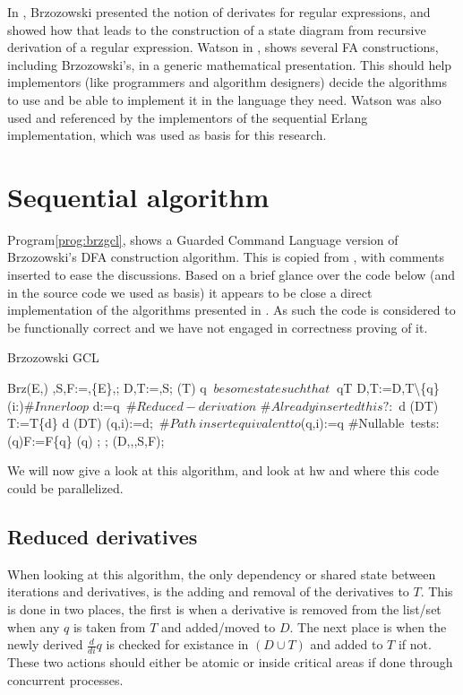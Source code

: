 \documentclass[a4paper,11pt]{report}
\begin{document}
In \cite{brzozowski1964derivatives}, Brzozowski presented the notion
of derivates for regular expressions, and showed how that leads to the
construction of a state diagram from recursive derivation of a regular
expression.  Watson in \cite{watson1995taxonomies}, shows several FA
constructions, including Brzozowski's, in a generic mathematical
presentation. This should help implementors (like programmers and
algorithm designers) decide the algorithms to use and be able to
implement it in the language they need. Watson was also used and
referenced by the implementors of the sequential Erlang
implementation, which was used as basis for this research.

\section{Sequential algorithm}
\label{sec:seq-algo}

Program\ref{prog:brzgcl}, shows a Guarded Command Language version of
Brzozowski's DFA construction algorithm. This is copied from
\cite{strauss2008concurrent}, with comments inserted to ease the
discussions. Based on a brief glance over the code below (and in the
source code we used as basis) it appears to be close a direct
implementation of the algorithms presented in
\cite{watson1995taxonomies}. As such the code is considered to be
functionally correct and we have not engaged in correctness proving
of it. \begin{Program}[thf]
\caption{Brzozowski GCL 
\cite{Struass}}\label{prog:brzgcl}
\begin{gcl}
\FUNC Brz(E,\Sigma)\ARROW
\delta,S,F:=\emptyset,\{E\},\emptyset;
D,T:=\emptyset,S;
\DO (T\neq \emptyset) \ARROW
\LET q $\ be some state such that\ $ q\in T
D,T:=D,T\backslash \{q\}
\FOR (i:\Sigma)\ARROW $\#Inner loop$
d:=q\ $\#Reduced-derivation$
$\#Already inserted this $$?:$
\IF d \notin (D\cup T) \ARROW T:=T\cup\{d\}
\BAR d \in (D\cup T) \ARROW \SKIP
\FI
\delta(q,i):=d;\ $\#Path\ insert equivalent to $\delta(q,i):=q
\ROF
\#Nullable\ tests:
\IF \epsilon\in {}(q)\ARROW F:=F\cup\{q\}
\BAR \epsilon\notin {}(q)\ARROW \SKIP
\FI;
\OD;
\RETURN(D,\Sigma,\delta,S,F);
\end{gcl}
\end{Program}

We will now give a look at this algorithm, and look at hw and where
this code could be parallelized.

\subsection{Reduced derivatives}
\label{sec:brzredder}
When looking at this algorithm, the only dependency or shared state
between iterations and derivatives, is the adding and removal of the
derivatives to $T$. This is done in two places, the first is when a
derivative is removed from the list/set when any $q$ is taken from $T$
and added/moved to $D$. The next place is when the newly derived
$\frac{d}{di}q$ is checked for existance in $(D\cup T)$ and added to
$T$ if not. These two actions should either be atomic or inside
critical areas if done through concurrent processes.
\end{document}
